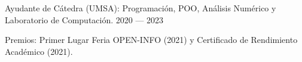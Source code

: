 Ayudante de Cátedra (UMSA): Programación, POO, Análisis Numérico y Laboratorio de Computación. \hfill 2020 --- 2023

Premios: Primer Lugar Feria OPEN-INFO (2021) y Certif{}icado de Rendimiento Académico (2021).
